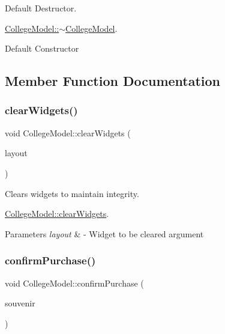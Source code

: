 Default Destructor. 

\mbox{\hyperlink{class_college_model_a2edbda0635ecdd023e4d7ea8258f72e3}{College\+Model\+::$\sim$\+College\+Model}}.

Default Constructor 

\subsection{Member Function Documentation}
\mbox{\label{class_college_model_adad9674dbee23e82f64508cd1cfe2670}} 
\subsubsection{\texorpdfstring{clear\+Widgets()}{clearWidgets()}}
{\footnotesize\ttfamily void College\+Model\+::clear\+Widgets (\begin{DoxyParamCaption}\item[{Q\+Layout $\ast$}]{layout }\end{DoxyParamCaption})}



Clears widgets to maintain integrity. 

\mbox{\hyperlink{class_college_model_adad9674dbee23e82f64508cd1cfe2670}{College\+Model\+::clear\+Widgets}}.


\begin{DoxyParams}{Parameters}
{\em layout} & -\/ Widget to be cleared argument \\
\hline
\end{DoxyParams}
\mbox{\label{class_college_model_a0bf105af39d44c58b7acfc4600f739cf}} 
\subsubsection{\texorpdfstring{confirm\+Purchase()}{confirmPurchase()}}
{\footnotesize\ttfamily void College\+Model\+::confirm\+Purchase (\begin{DoxyParamCaption}\item[{\mbox{\hyperlink{structsouvenir_item}{souvenir\+Item}}}]{souvenir }\end{DoxyParamCaption})}



